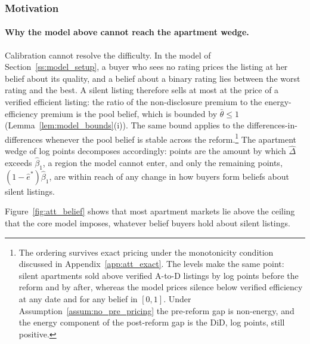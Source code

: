 \subsubsection{Motivation}
\label{ss:att_motivation}

\paragraph{Why the model above cannot reach the apartment wedge.}
Calibration cannot resolve the difficulty. In the model of Section~\ref{ss:model_setup}, a buyer who sees no rating prices the listing at her belief about its quality, and a belief about a binary rating lies between the worst rating and the best. A silent listing therefore sells at most at the price of a verified efficient listing: the ratio of the non-disclosure premium to the energy-efficiency premium is the pool belief, which is bounded by $\bar\theta\le1$ (Lemma~\ref{lem:model_bounds}(i)). The same bound applies to the differences-in-differences whenever the pool belief is stable across the reform.\footnote{The ordering survives exact pricing under the monotonicity condition discussed in Appendix~\ref{app:att_exact}. The levels make the same point: silent apartments sold above verified A-to-D listings by \attLevelGapPreApt{} log points before the reform and by \attLevelGapPostApt{} after, whereas the model prices silence below verified efficiency at any date and for any belief in $[0,1]$. Under Assumption~\ref{assum:no_pre_pricing} the pre-reform gap is non-energy, and the energy component of the post-reform gap is the DiD, \attExcessApt{} log points, still positive.} The apartment wedge of \attLamApt{} log points decomposes accordingly: \attExcessApt{} points are the amount by which $\hat\Delta$ exceeds $\hat\beta_1$, a region the model cannot enter, and only the remaining \attReachApt{} points, $(1-\hat e^*)\hat\beta_1$, are within reach of any change in how buyers form beliefs about silent listings.

Figure~\ref{fig:att_belief} shows that most apartment markets lie above the ceiling that the core model imposes, whatever belief buyers hold about silent listings.

